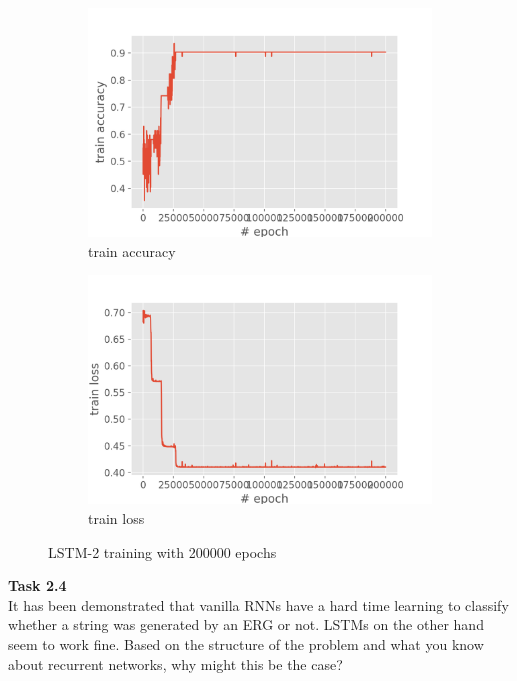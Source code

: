 \documentclass[12pt,article]{article}
\newenvironment{task}[2][Task]
    { \begin{mdframed}[backgroundcolor=gray!20] \textbf{#1 #2} \\}
    {  \end{mdframed}}
\begin{document}
\begin{figure}[H]
\centering
\begin{subfigure}{.5\textwidth}
    \centering
    \includegraphics[scale=0.6]{LSTM-2-200000_parity_train_accuracy.png} \par
    \caption{train accuracy}
\end{subfigure}%
\begin{subfigure}{.5\textwidth}
    \centering
    \includegraphics[scale=0.6]{LSTM-2-200000_parity_train_loss.png} \par
    \caption{train loss}
\end{subfigure}
\caption{LSTM-2 training with 200000 epochs}
\label{fig:lstm2-200000-training}
\end{figure}


\begin{task}{2.4} 
It has been demonstrated that vanilla RNNs have a hard time learning to classify whether a string was generated by an ERG or not. LSTMs on the other hand seem to work fine. Based on the structure of the problem and what you know about recurrent networks, why might this be the case? 
\end{task}
\end{document}
